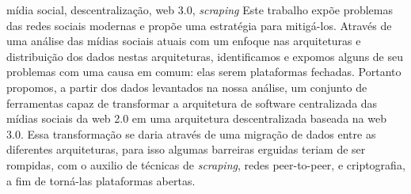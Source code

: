 \documentclass[portuguese,oneside]{tcc}
\begin{document}
\begin{resumo}{mídia social, descentralização, web 3.0, \textit{scraping}}
Este trabalho expõe problemas das redes sociais modernas e propõe uma estratégia para mitigá-los.
Através de uma análise das mídias sociais atuais com um enfoque nas arquiteturas e distribuição dos dados nestas arquiteturas, identificamos e expomos alguns de seu problemas com uma causa em comum: elas serem plataformas fechadas.
Portanto propomos, a partir dos dados levantados na nossa análise, um conjunto de ferramentas capaz de transformar a arquitetura de software centralizada das mídias sociais da web 2.0 em uma arquitetura descentralizada baseada na web 3.0.
Essa transformação se daria através de uma migração de dados entre as diferentes arquiteturas, para isso algumas barreiras erguidas teriam de ser rompidas, com o auxilio de técnicas de \textit{scraping}, redes peer-to-peer, e criptografia, a fim de torná-las plataformas abertas.

\end{resumo}

\begin{abstract}{social media, decentralization, web 3.0, scraping}
Your abstract in English here. lorem ipsum dolor sit amet
consetetur sadipscing elitr sed diam nonumy eirmod tempor invidunt
ut labore et dolore magna aliquyam erat sed diam voluptua at vero
eos et accusam et justo duo dolores et ea rebum stet clita kasd
gubergren no sea takimata sanctus est lorem ipsum dolor sit amet
lorem ipsum dolor sit amet consetetur sadipscing elitr sed diam
nonumy eirmod tempor invidunt ut labore et dolore magna aliquyam
erat sed diam voluptua at
\end{abstract}
\end{document}
